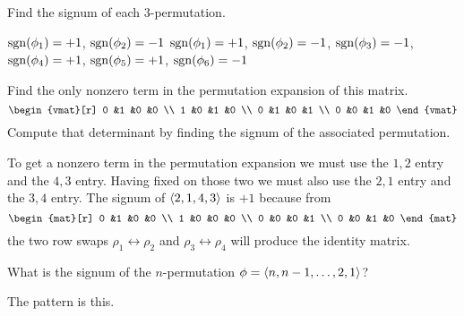 \begin{exercises}
\begin{exparts}
      \partsitem Find the signum of each $3$-permutation.
    \end{exparts}
    \begin{answer}
      \begin{exparts}
        \partsitem \( \operatorname{sgn}(\phi_1)=+1 \), \( \operatorname{sgn}(\phi_2)=-1 \)
        \partsitem \( \operatorname{sgn}(\phi_1)=+1 \), \( \operatorname{sgn}(\phi_2)=-1 \),
              \( \operatorname{sgn}(\phi_3)=-1 \), \( \operatorname{sgn}(\phi_4)=+1 \),
              \( \operatorname{sgn}(\phi_5)=+1 \), \( \operatorname{sgn}(\phi_6)=-1 \)
      \end{exparts}  
     \end{answer}
  \item 
    Find the only nonzero term in the permutation expansion of
    this matrix.
    \begin{equation*}
      \begin{vmat}[r]
        0  &1  &0  &0  \\
        1  &0  &1  &0  \\
        0  &1  &0  &1  \\
        0  &0  &1  &0
      \end{vmat}
    \end{equation*}
    Compute that determinant by finding the signum of the associated
    permutation.
    \begin{answer}
      To get a nonzero term in the permutation expansion we must use
      the \( 1,2 \) entry and the \( 4,3 \) entry.
      Having fixed on those two we must also use the \( 2,1 \) entry and
      the \( 3,4 \) entry.
      The signum of \( \langle2,1,4,3\rangle \) is \( +1 \) because from
      \begin{equation*}
        \begin{mat}[r]
          0  &1  &0  &0  \\
          1  &0  &0  &0  \\
          0  &0  &0  &1  \\
          0  &0  &1  &0            
        \end{mat}
      \end{equation*}
      the two row swaps $\rho_1\leftrightarrow\rho_2$ and 
      $\rho_3\leftrightarrow\rho_4$ will produce the identity matrix.  
    \end{answer}
  \item  
    \cite{Strang}
    What is the signum of the $n$-permutation
    \( \phi=\langle n,n-1,\dots,2,1\rangle \)?
    \begin{answer}
      The pattern is this.
      \begin{center}

\end{center}
\end{answer}
\end{exercises}
